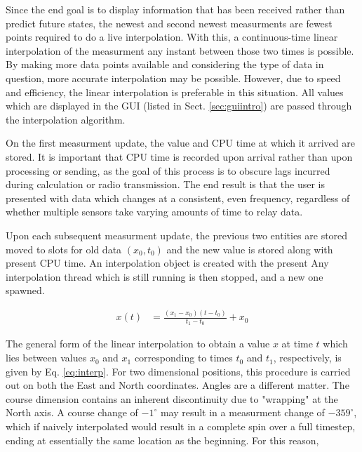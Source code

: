\documentclass[12pt]{report}
\begin{document}
Since the end goal is to display information that has been received rather than predict future states, the newest and second newest measurments are fewest points required to do a live interpolation. With this, a continuous-time linear interpolation of the measurment any instant between those two times is possible. By making more data points available and considering the type of data in question, more accurate interpolation may be possible. However, due to speed and efficiency, the linear interpolation is preferable in this situation. All values which are displayed in the GUI (listed in Sect. \ref{sec:guiintro}) are passed through the interpolation algorithm.

On the first measurment update, the value and CPU time at which it arrived are stored. It is important that CPU time is recorded upon arrival rather than upon processing or sending, as the goal of this process is to obscure lags incurred during calculation or radio transmission. The end result is that the user is presented with data which changes at a consistent, even frequency, regardless of whether multiple sensors take varying amounts of time to relay data.

Upon each subsequent measurment update, the previous two entities are stored moved to slots for old data $(x_0, t_0)$ and the new value is stored along with present CPU time. An interpolation object is created with the present Any interpolation thread which is still running is then stopped, and a new one spawned.

\begin{align} \label{eq:interp}
    x(t) &= \frac{ (x_1 - x_0)(t - t_0) } { t_1 - t_0 } + x_0
\end{align}

The general form of the linear interpolation to obtain a value $x$ at time $t$ which lies between values $x_0$ and $x_1$ corresponding to times $t_0$ and $t_1$, respectively, is given by Eq. \ref{eq:interp}.
For two dimensional positions, this procedure is carried out on both the East and North coordinates. 
Angles are a different matter. The course dimension contains an inherent discontinuity due to "wrapping" at the North axis. A course change of $-1^\circ$ may result in a measurment change of $-359^\circ$, which if naively interpolated would result in a complete spin over a full timestep, ending at essentially the same location as the beginning. For this reason, 
\end{document}

